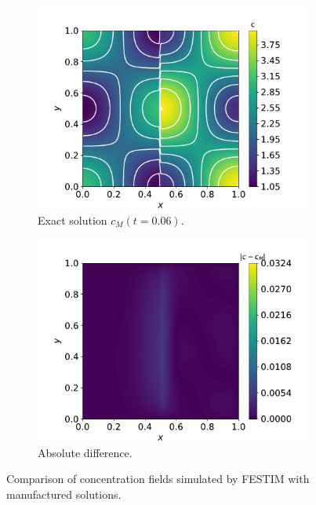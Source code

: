 \begin{figure}
\begin{subfigure}{0.33\linewidth}
        \includegraphics[width=\linewidth]{Figures/Chapter3/monoblocks/interface_condition/u_exact_t0.06.pdf}
        \caption{Exact solution $c_M(t=0.06)$.}
    \end{subfigure}%
    \begin{subfigure}{0.33\linewidth}
        \centering
        \includegraphics[width=\linewidth]{Figures/Chapter3/monoblocks/interface_condition/diff_t0.06.pdf}
        \caption{Absolute difference.}
    \end{subfigure}
    \caption{Comparison of concentration fields simulated by FESTIM with manufactured solutions.}
    \label{fig: results MMS}
\end{figure}


